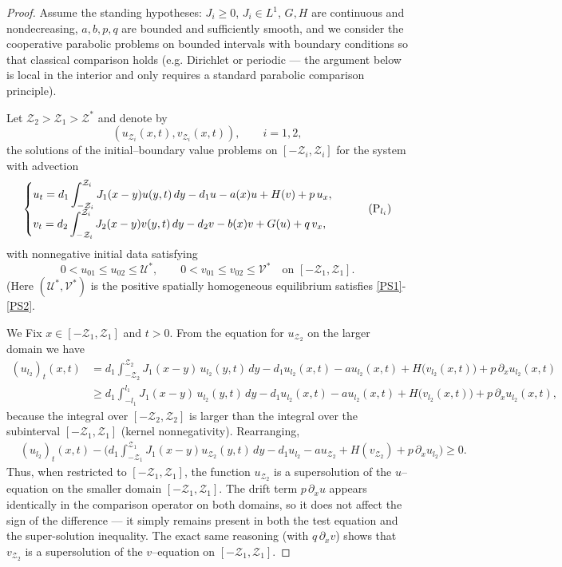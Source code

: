 \documentclass[a4paper,11pt]{amsart}
\theoremstyle{definition}
\numberwithin{equation}{section}
\theoremstyle{definition}
\begin{document}
\begin{proof}
Assume the standing hypotheses: $J_i\geq0$, $J_i\in L^1$, $G,H$ are continuous and nondecreasing, $a,b,p,q$ are bounded and sufficiently smooth, and we consider the cooperative parabolic problems on bounded intervals with boundary conditions so that classical comparison holds (e.g. Dirichlet or periodic — the argument below is local in the interior and only requires a standard parabolic comparison principle).

Let $\mathcal Z_2>\mathcal Z_1>\mathcal Z^\ast$ and denote by
\[
(u_{\mathcal Z_i}(x,t),v_{\mathcal Z_i}(x,t)),\qquad i=1,2,
\]
the solutions of the initial–boundary value problems on $[-\mathcal Z_i,\mathcal Z_i]$ for the system with advection
\[
\begin{cases}
u_t = d_1\displaystyle\int_{-\mathcal Z_i}^{\mathcal Z_i} J_1(x-y)u(y,t)\,dy - d_1 u - a(x)u + H(v) + p\,u_x,\\[6pt]
v_t = d_2\displaystyle\int_{-\mathcal Z_i}^{\mathcal Z_i} J_2(x-y)v(y,t)\,dy - d_2 v - b(x)v + G(u) + q\,v_x,
\end{cases}
\tag{P$_{l_i}$}
\]
with nonnegative initial data satisfying
\[
0<u_{01}\leq u_{02}\leq \mathscr{U}^{\ast},\qquad 0<v_{01}\leq v_{02}\leq \mathscr{V}^{\ast}
\quad\text{on }[-\mathcal Z_1,\mathcal Z_1].
\]
(Here \((\mathscr{U}^{\ast}, \mathscr{V}^{\ast})\) is the positive spatially homogeneous equilibrium satisfies  \eqref{PS1}-\eqref{PS2}.


We Fix \(x\in[-\mathcal Z_1, \mathcal Z_1]\) and \(t>0\). From the equation for \(u_{\mathcal Z_2}\) on the larger domain we have
\[
\begin{aligned}
(u_{l_2})_t(x,t)
&= d_1\int_{-\mathcal Z_2}^{\mathcal Z_2} J_1(x-y)\,u_{l_2}(y,t)\,dy - d_1 u_{l_2}(x,t) - a u_{l_2}(x,t) + H\big(v_{l_2}(x,t)\big) + p\,\partial_x u_{l_2}(x,t)\\
&\ge d_1\int_{-l_1}^{l_1} J_1(x-y)\,u_{l_2}(y,t)\,dy - d_1 u_{l_2}(x,t) - a u_{l_2}(x,t) + H\big(v_{l_2}(x,t)\big) + p\,\partial_x u_{l_2}(x,t),
\end{aligned}
\]
because the integral over \([-\mathcal Z_2, \mathcal Z_2]\) is larger than the integral over the subinterval \([-\mathcal Z_1, \mathcal Z_1]\) (kernel nonnegativity). Rearranging,
\[
\begin{aligned}
&(u_{l_2})_t(x,t)
- \Big( d_1\int_{-\mathcal Z_1}^{\mathcal Z_1} J_1(x-y)u_{\mathcal Z_2}(y,t)\,dy - d_1 u_{l_2} - a u_{\mathcal Z_2} + H(v_{\mathcal Z_2}) + p\,\partial_x u_{l_2}\Big)
\ge 0.
\end{aligned}
\]
Thus, when restricted to $[-\mathcal Z_1, \mathcal Z_1]$, the function $u_{\mathcal Z_2}$ is a supersolution of the $u$–equation on the smaller domain \( [-\mathcal Z_1,\mathcal Z_1] \). The drift term \(p\,\partial_x u\) appears identically in the comparison operator on both domains, so it does not affect the sign of the difference — it simply remains present in both the test equation and the super-solution inequality. The exact same reasoning (with \(q\,\partial_x v\)) shows that \(v_{\mathcal Z_2}\) is a supersolution of the $v$–equation on \([-\mathcal Z_1, \mathcal Z_1]\).


\end{proof}
\end{document}
